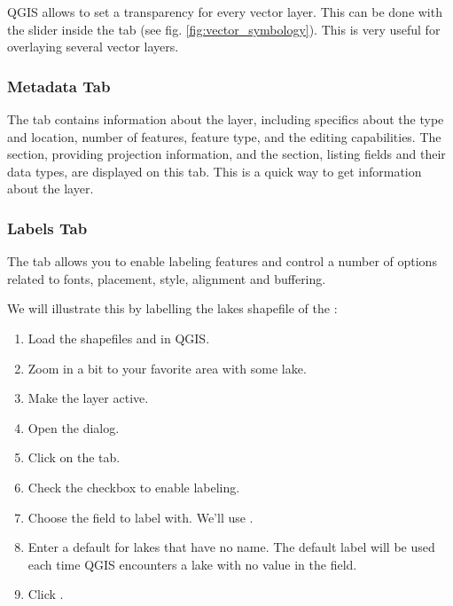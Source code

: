  \label{sec:vect_transparency} 
QGIS \CURRENT allows to set a transparency for every vector layer. This can be done with
the slider  inside the tab  (see fig. \ref{fig:vector_symbology}).
This is very useful for overlaying several vector layers.

\subsubsection{Metadata Tab}

The  tab contains information about the layer, including specifics
about the type and location, number of features, feature type, and the editing
capabilities. The  section, providing projection information, and the  section,
listing fields and their data types, are displayed 
on this tab. This is a quick way to get information about the layer.

\subsubsection{Labels Tab}

The  tab allows you to enable labeling features and control a number of
options related to fonts, placement, style, alignment and buffering.

We will illustrate this by labelling the lakes shapefile of the
:

\begin{enumerate}
\item Load the shapefiles  and  in QGIS.
\item Zoom in a bit to your favorite area with some lake.
\item Make the  layer active.
\item Open the  dialog.
\item Click on the  tab.
\item Check the  checkbox to enable labeling.
\item Choose the field to label with. 
  We'll use .
\item Enter a default for lakes that have no name. The default label will be
  used each time QGIS encounters a lake with no value in the  field.
\item Click .
\end{enumerate} 

